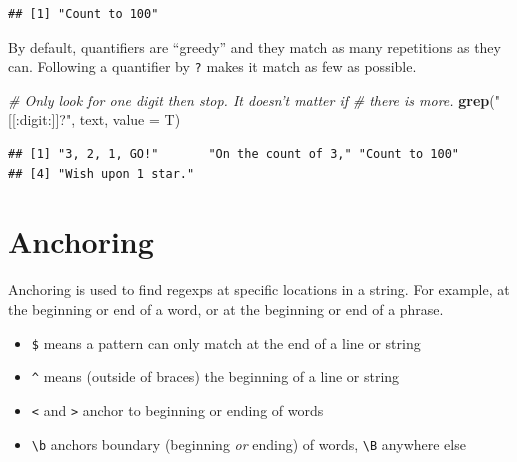 \documentclass[
]{book}
\newenvironment{Shaded}{\begin{snugshade}}{\end{snugshade}}
\newcommand{\CommentTok}[1]{\textcolor[rgb]{0.56,0.35,0.01}{\textit{#1}}}
\newcommand{\DataTypeTok}[1]{\textcolor[rgb]{0.13,0.29,0.53}{#1}}
\newcommand{\KeywordTok}[1]{\textcolor[rgb]{0.13,0.29,0.53}{\textbf{#1}}}
\newcommand{\NormalTok}[1]{#1}
\newcommand{\StringTok}[1]{\textcolor[rgb]{0.31,0.60,0.02}{#1}}
\providecommand{\tightlist}{%
  \setlength{\itemsep}{0pt}\setlength{\parskip}{0pt}}
\begin{document}
\begin{verbatim}
## [1] "Count to 100"
\end{verbatim}

By default, quantifiers are ``greedy'' and they match as many repetitions as they can. Following a quantifier by \texttt{?} makes it match as few as possible.

\begin{Shaded}
\begin{Highlighting}[]
\CommentTok{# Only look for one digit then stop.  It doesn't matter if}
\CommentTok{# there is more.}
\KeywordTok{grep}\NormalTok{(}\StringTok{"[[:digit:]]?"}\NormalTok{, text, }\DataTypeTok{value =}\NormalTok{ T)}
\end{Highlighting}
\end{Shaded}

\begin{verbatim}
## [1] "3, 2, 1, GO!"       "On the count of 3," "Count to 100"      
## [4] "Wish upon 1 star."
\end{verbatim}

\hypertarget{anchoring}{%
\section{Anchoring}\label{anchoring}}

Anchoring is used to find regexps at specific locations in a string. For example, at the beginning or end of a word, or at the beginning or end of a phrase.

\begin{itemize}
\tightlist
\item
  \texttt{\$} means a pattern can only match at the end of a line or string
\item
  \texttt{\^{}} means (outside of braces) the beginning of a line or string
\item
  \texttt{\textless{}} and \texttt{\textgreater{}} anchor to beginning or ending of words
\item
  \texttt{\textbackslash{}b} anchors boundary (beginning \emph{or} ending) of words, \texttt{\textbackslash{}B} anywhere else
\end{itemize}

\begin{Shaded}
\end{Shaded}
\end{document}
